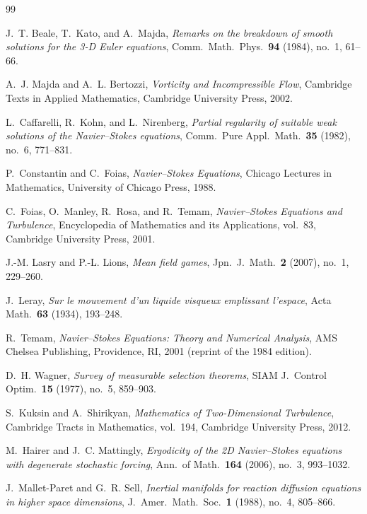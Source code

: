 \documentclass[12pt,a4paper]{article}
\theoremstyle{definition}
\theoremstyle{plain}
\theoremstyle{remark}
\begin{document}
\begin{thebibliography}{99}

J.~T. Beale, T.~Kato, and A.~Majda,
\emph{Remarks on the breakdown of smooth solutions for the 3-D Euler equations},
Comm.\ Math.\ Phys.\ \textbf{94} (1984), no.~1, 61--66.

A.~J. Majda and A.~L. Bertozzi,
\emph{Vorticity and Incompressible Flow},
Cambridge Texts in Applied Mathematics, Cambridge University Press, 2002.

L.~Caffarelli, R.~Kohn, and L.~Nirenberg,
\emph{Partial regularity of suitable weak solutions of the Navier--Stokes equations},
Comm.\ Pure Appl.\ Math.\ \textbf{35} (1982), no.~6, 771--831.

P.~Constantin and C.~Foias,
\emph{Navier--Stokes Equations},
Chicago Lectures in Mathematics, University of Chicago Press, 1988.

C.~Foias, O.~Manley, R.~Rosa, and R.~Temam,
\emph{Navier--Stokes Equations and Turbulence},
Encyclopedia of Mathematics and its Applications, vol.~83, Cambridge University Press, 2001.

J.-M. Lasry and P.-L. Lions,
\emph{Mean field games},
Jpn.\ J.\ Math.\ \textbf{2} (2007), no.~1, 229--260.

J.~Leray,
\emph{Sur le mouvement d'un liquide visqueux emplissant l'espace},
Acta Math.\ \textbf{63} (1934), 193--248.

R.~Temam,
\emph{Navier--Stokes Equations: Theory and Numerical Analysis},
AMS Chelsea Publishing, Providence, RI, 2001 (reprint of the 1984 edition).

D.~H. Wagner,
\emph{Survey of measurable selection theorems},
SIAM J.\ Control Optim.\ \textbf{15} (1977), no.~5, 859--903.

S.~Kuksin and A.~Shirikyan,
\emph{Mathematics of Two-Dimensional Turbulence},
Cambridge Tracts in Mathematics, vol.~194, Cambridge University Press, 2012.

M.~Hairer and J.~C. Mattingly,
\emph{Ergodicity of the 2D Navier--Stokes equations with degenerate stochastic forcing},
Ann.\ of Math.\ \textbf{164} (2006), no.~3, 993--1032.

J.~Mallet-Paret and G.~R. Sell,
\emph{Inertial manifolds for reaction diffusion equations in higher space dimensions},
J.~Amer.\ Math.\ Soc.\ \textbf{1} (1988), no.~4, 805--866.


\end{thebibliography}
\end{document}
